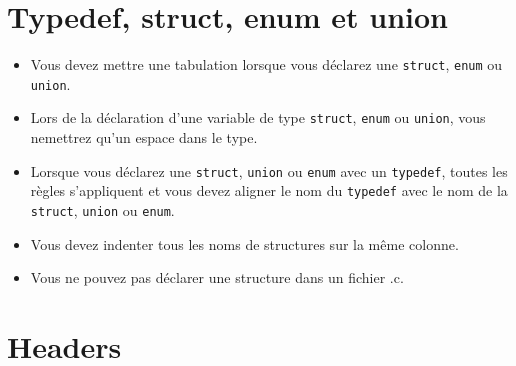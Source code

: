 \documentclass{42-fr}
\begin{document}
    \section{Typedef, struct, enum et union}

        \begin{itemize}

            \item Vous devez mettre une tabulation lorsque vous déclarez une \texttt{struct}, \texttt{enum} ou \texttt{union}.

            \item Lors de la déclaration d’une variable de type \texttt{struct}, \texttt{enum} ou \texttt{union},
                vous nemettrez qu’un espace dans le type.

            \item Lorsque vous déclarez une \texttt{struct}, \texttt{union} ou \texttt{enum} avec un \texttt{typedef},
                toutes les règles s’appliquent et vous devez aligner le nom du \texttt{typedef} 
                avec le nom de la \texttt{struct}, \texttt{union} ou \texttt{enum}.

            \item Vous devez indenter tous les noms de structures sur la même colonne.

            \item Vous ne pouvez pas déclarer une structure dans un fichier .c.

        \end{itemize}
        \newpage


    \section{Headers}
\end{document}
